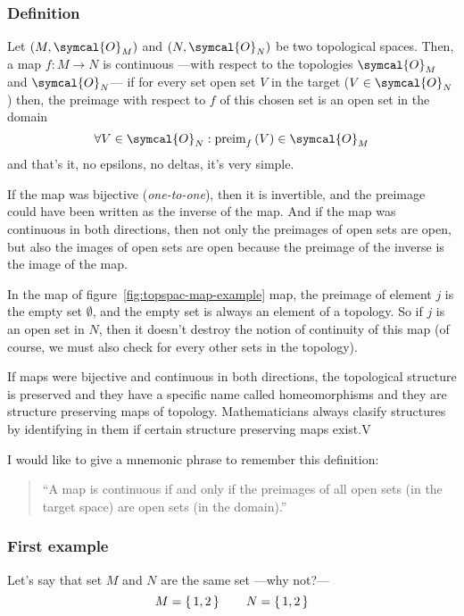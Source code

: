   \subsubsection{Definition}
  Let $(M,\symcal{O}_M)$ and $(N,\symcal{O}_N)$ be two topological spaces.
  Then, a map $f:M\longrightarrow N$
  is continuous ---with respect to the topologies
  $\symcal{O}_M$ and $\symcal{O}_N$--- if for every set open set $V$ in the
  target\footnotemark{} ($V\in\symcal{O}_N$) then,
  the preimage with respect to $f$ of this chosen set is an open set in the
  domain
  \[
    \forall V\in\symcal{O}_N : \text{preim}_f\,(V) \in \symcal{O}_M
  \]
  and that's it, no epsilons, no deltas, it's very simple.

  If the map was bijective (\emph{one-to-one}), then it is invertible, and the
  preimage could have been written as the inverse of the map. And if the map
  was continuous in both directions, then not only the preimages of open sets
  are open, but also the images of open sets are open because the preimage of
  the inverse is the image of the map.

  In the map of figure~\ref{fig:topspac-map-example} map, the preimage of
  element $j$\/ is the empty set $\emptyset$, and the empty set is always an
  element of a topology.
  So if $j$\/ is an open set in $N$, then it doesn't destroy the notion of
  continuity of this map (of course, we must also check for every other sets in
  the topology).

  If maps were bijective and continuous in both directions, the topological
  structure is preserved and they have a specific name called homeomorphisms
  and they are structure preserving maps of topology. Mathematicians always
  clasify structures by identifying in them if certain structure preserving
  maps exist.V

  I would like to give a mnemonic phrase to remember this definition:
  \begin{quote}
    ``A map is continuous if and only if the preimages of all open sets (in the
    target space) are open sets (in the domain).''
  \end{quote}
 
  \subsubsection{First example}
  Let's say that set $M$ and $N$ are the same set ---why not?---
  \[
    M = \set{1, 2}
    \hspace{2em}
    N = \set{1,2}
  \]

